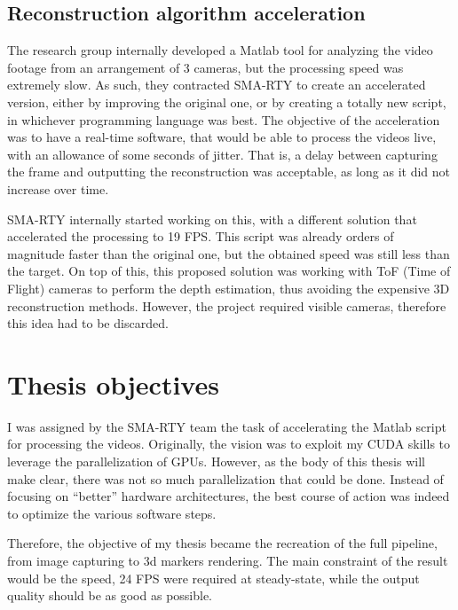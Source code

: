 \subsection{Reconstruction algorithm acceleration}

The research group internally developed a Matlab tool for analyzing the video footage from an arrangement of 3 cameras, but the processing speed was extremely slow.
As such, they contracted SMA-RTY to create an accelerated version, either by improving the original one, or by creating a totally new script, in whichever programming language was best.
The objective of the acceleration was to have a real-time software, that would be able to process the videos live, with an allowance of some seconds of jitter.
That is, a delay between capturing the frame and outputting the reconstruction was acceptable, as long as it did not increase over time.

SMA-RTY internally started working on this, with a different solution that accelerated the processing to 19 FPS.
This script was already orders of magnitude faster than the original one, but the obtained speed was still less than the target.
On top of this, this proposed solution was working with ToF (Time of Flight) cameras to perform the depth estimation, thus avoiding the expensive 3D reconstruction methods.
However, the project required visible cameras, therefore this idea had to be discarded.

\section{Thesis objectives}

I was assigned by the SMA-RTY team the task of accelerating the Matlab script for processing the videos.
Originally, the vision was to exploit my CUDA skills to leverage the parallelization of GPUs.
However, as the body of this thesis will make clear, there was not so much parallelization that could be done.
Instead of focusing on ``better'' hardware architectures, the best course of action was indeed to optimize the various software steps.

Therefore, the objective of my thesis became the recreation of the full pipeline, from image capturing to 3d markers rendering.
The main constraint of the result would be the speed, 24 FPS were required at steady-state, while the output quality should be as good as possible.

